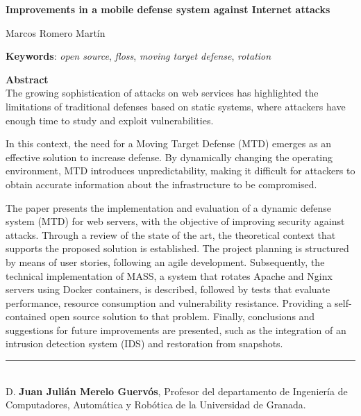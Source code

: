 \cleardoublepage

\begin{center}
	{\large\bfseries Improvements in a mobile defense system against Internet attacks}\\
\end{center}
\begin{center}
	Marcos Romero Martín\\
\end{center}
\vspace{0.5cm}
\noindent\textbf{Keywords}: \textit{open source}, \textit{floss}, \textit{moving target defense},  \textit{rotation}
\vspace{0.7cm}

\noindent\textbf{Abstract}\\
The growing sophistication of attacks on web services has highlighted the limitations of traditional defenses based on static systems, where attackers have enough time to study and exploit vulnerabilities.

In this context, the need for a Moving Target Defense (MTD) emerges as an effective solution to increase defense. By dynamically changing the operating environment, MTD introduces unpredictability, making it difficult for attackers to obtain accurate information about the infrastructure to be compromised.

The paper presents the implementation and evaluation of a dynamic defense system (MTD) for web servers, with the objective of improving security against attacks. Through a review of the state of the art, the theoretical context that supports the proposed solution is established. The project planning is structured by means of user stories, following an agile development. Subsequently, the technical implementation of MASS, a system that rotates Apache and Nginx servers using Docker containers, is described, followed by tests that evaluate performance, resource consumption and vulnerability resistance. Providing a self-contained open source solution to that problem. Finally, conclusions and suggestions for future improvements are presented, such as the integration of an intrusion detection system (IDS) and restoration from snapshots.

\cleardoublepage

\thispagestyle{empty}

\noindent\rule[-1ex]{\textwidth}{2pt}\\[4.5ex]

D. \textbf{Juan Julián Merelo Guervós}, Profesor del departamento de Ingeniería de Computadores, Automática y Robótica de la Universidad de Granada.

